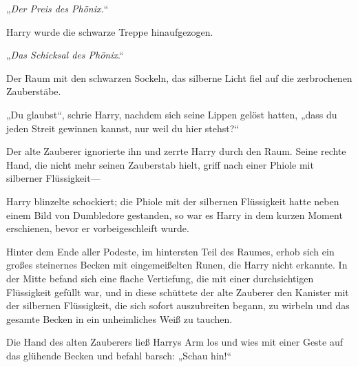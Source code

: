 „\emph{Der Preis des Phönix.}“

Harry wurde die schwarze Treppe hinaufgezogen.

„\emph{Das Schicksal des Phönix}.“

Der Raum mit den schwarzen Sockeln, das silberne Licht fiel auf die zerbrochenen Zauberstäbe.

„Du glaubst“, schrie Harry, nachdem sich seine Lippen gelöst hatten, „dass du jeden Streit gewinnen kannst, nur weil du hier stehst?“

Der alte Zauberer ignorierte ihn und zerrte Harry durch den Raum. Seine rechte Hand, die nicht mehr seinen Zauberstab hielt, griff nach einer Phiole mit silberner Flüssigkeit—

Harry blinzelte schockiert; die Phiole mit der silbernen Flüssigkeit hatte neben einem Bild von Dumbledore gestanden, so war es Harry in dem kurzen Moment erschienen, bevor er vorbeigeschleift wurde.

Hinter dem Ende aller Podeste, im hintersten Teil des Raumes, erhob sich ein großes steinernes Becken mit eingemeißelten Runen, die Harry nicht erkannte. In der Mitte befand sich eine flache Vertiefung, die mit einer durchsichtigen Flüssigkeit gefüllt war, und in diese schüttete der alte Zauberer den Kanister mit der silbernen Flüssigkeit, die sich sofort auszubreiten begann, zu wirbeln und das gesamte Becken in ein unheimliches Weiß zu tauchen.

Die Hand des alten Zauberers ließ Harrys Arm los und wies mit einer Geste auf das glühende Becken und befahl barsch: „Schau hin!“

